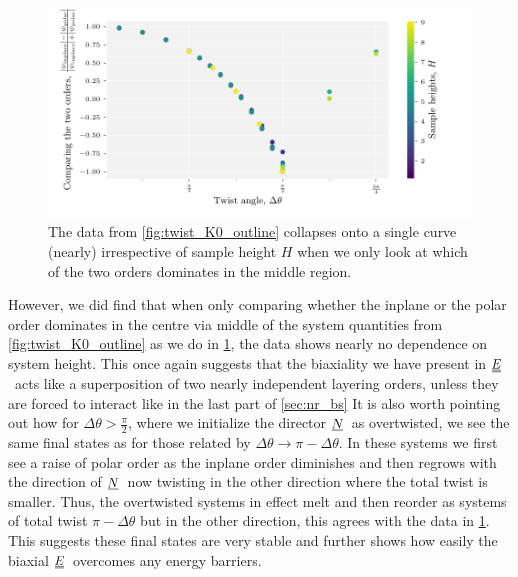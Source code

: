 \documentclass[12pt]{article}
\newcommand{\suf}[2]{\stackunder[0.5pt]{\stackunder[1pt]{\ensuremath{#1}}{\rule{\widthof{\ensuremath{#2}}*\real{0.9}}{.1ex}}}{}}
\newcommand{\duf}[2]{\stackunder[0.5pt]{\stackunder[0.8pt]{\stackunder[1pt]{\ensuremath{#1}}{\rule{\widthof{\ensuremath{#2}}*\real{0.9}}{.1ex}}}{\rule{\widthof{\ensuremath{#2}}*\real{0.9}}{.1ex}}}{}}
\newcommand{\su}[1]{\suf{#1}{#1}}
\newcommand{\du}[1]{\duf{#1}{#1}}
\newcommand{\NN}{\ensuremath{\su{N}}}
\newcommand{\EE}{\ensuremath{\du{E}}}
\begin{document}
        \begin{figure}[t!]
            \begin{center}
                \includegraphics{figures/data_plots/twist_K0_coll.pdf}
            \end{center}
            \caption{
                The data from \cref{fig:twist_K0_outline} collapses onto a single curve (nearly) irrespective of sample height $H$ when we only look at which of the two orders dominates in the middle region.
            }\label{fig:twist_K0_coll}
        \end{figure}

        However, we did find that when only comparing whether the inplane or the polar order dominates in the centre via middle of the system quantities from \cref{fig:twist_K0_outline} as we do in \cref{fig:twist_K0_coll}, the data shows nearly no dependence on system height.
        This once again suggests that the biaxiality we have present in \EE\ acts like a superposition of two nearly independent layering orders, unless they are forced to interact like in the last part of \cref{sec:nr_bs}
        It is also worth pointing out how for $\Delta\theta > \frac{\pi}{2}$, where we initialize the director \NN\ as overtwisted, we see the same final states as for those related by $\Delta\theta \rightarrow \pi - \Delta\theta$.
        In these systems we first see a raise of polar order as the inplane order diminishes and then regrows with the direction of \NN\ now twisting in the other direction where the total twist is smaller.
        Thus, the overtwisted systems in effect melt and then reorder as systems of total twist $\pi - \Delta\theta$ but in the other direction, this agrees with the data in \cref{fig:twist_K0_coll}.
        This suggests these final states are very stable and further shows how easily the biaxial \EE\ overcomes any energy barriers.
\end{document}

